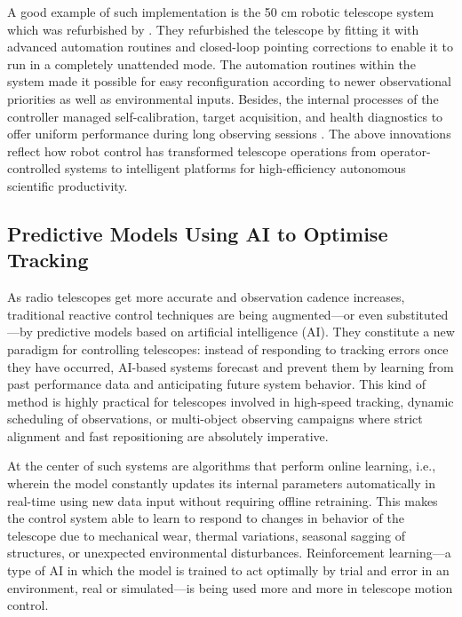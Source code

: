     A good example of such implementation is the 50 cm robotic telescope system which was refurbished by \cite{Stanzin2022}. They refurbished the telescope by fitting it with advanced automation routines and closed-loop pointing corrections to enable it to run in a completely unattended mode. The automation routines within the system made it possible for easy reconfiguration according to newer observational priorities as well as environmental inputs. Besides, the internal processes of the controller managed self-calibration, target acquisition, and health diagnostics to offer uniform performance during long observing sessions \cite{Stanzin2022}. The above innovations reflect how robot control has transformed telescope operations from operator-controlled systems to intelligent platforms for high-efficiency autonomous scientific productivity.

    \subsection{Predictive Models Using AI to Optimise Tracking}
    As radio telescopes get more accurate and observation cadence increases, traditional reactive control techniques are being augmented—or even substituted—by predictive models based on artificial intelligence (AI). They constitute a new paradigm for controlling telescopes: instead of responding to tracking errors once they have occurred, AI-based systems forecast and prevent them by learning from past performance data and anticipating future system behavior. This kind of method is highly practical for telescopes involved in high-speed tracking, dynamic scheduling of observations, or multi-object observing campaigns where strict alignment and fast repositioning are absolutely imperative.

    At the center of such systems are algorithms that perform online learning, i.e., wherein the model constantly updates its internal parameters automatically in real-time using new data input without requiring offline retraining. This makes the control system able to learn to respond to changes in behavior of the telescope due to mechanical wear, thermal variations, seasonal sagging of structures, or unexpected environmental disturbances. Reinforcement learning—a type of AI in which the model is trained to act optimally by trial and error in an environment, real or simulated—is being used more and more in telescope motion control.

